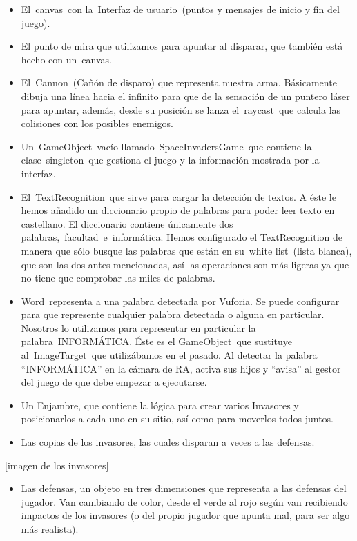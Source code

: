 \documentclass[]{article}
\begin{document}
\begin{itemize}
\itemsep1pt\parskip0pt
\item
  El~canvas~con la~Interfaz de usuario~(puntos y mensajes de inicio y
  fin del juego).
\item
  El punto de mira que utilizamos para apuntar al disparar, que también
  está hecho con un~canvas.
\item
  El~Cannon~(Cañón de disparo) que representa nuestra arma. Básicamente
  dibuja una línea hacia el infinito para que de la sensación de un
  puntero láser para apuntar, además, desde su posición se lanza
  el~raycast~que calcula las colisiones con los posibles enemigos.
\end{itemize}

\begin{itemize}
\itemsep1pt\parskip0pt
\item
  Un~GameObject~vacío llamado~SpaceInvadersGame~que contiene la
  clase~singleton~que gestiona el juego y la información mostrada por la
  interfaz.
\item
  El~TextRecognition~que sirve para cargar la detección de textos. A
  éste le hemos añadido un diccionario propio de palabras para poder
  leer texto en castellano. El diccionario contiene únicamente dos
  palabras,~facultad~e~informática. Hemos configurado el TextRecognition
  de manera que sólo busque las palabras que están en su~white
  list~(lista blanca), que son las dos antes mencionadas, así las
  operaciones son más ligeras ya que no tiene que comprobar las miles de
  palabras.
\item
  Word~representa a una palabra detectada por Vuforia. Se puede
  configurar para que represente cualquier palabra detectada o alguna en
  particular. Nosotros lo utilizamos para representar en particular la
  palabra~INFORMÁTICA. Éste es el GameObject~que sustituye
  al~ImageTarget~que utilizábamos en el pasado. Al detectar la palabra
  ``INFORMÁTICA'' en la cámara de RA, activa sus hijos y ``avisa'' al
  gestor del juego de que debe empezar a ejecutarse.
\item
  Un Enjambre, que contiene la lógica para crear varios Invasores y
  posicionarlos a cada uno en su sitio, así como para moverlos todos
  juntos.
\item
  Las copias de los invasores, las cuales disparan a veces a las
  defensas.
\end{itemize}

{[}imagen de los invasores{]}

\begin{itemize}
\itemsep1pt\parskip0pt
\item
  Las defensas, un objeto en tres dimensiones que representa a las
  defensas del jugador. Van cambiando de color, desde el verde al rojo
  según van recibiendo impactos de los invasores (o del propio jugador
  que apunta mal, para ser algo más realista).~~~~~~~~
\end{itemize}
\end{document}
